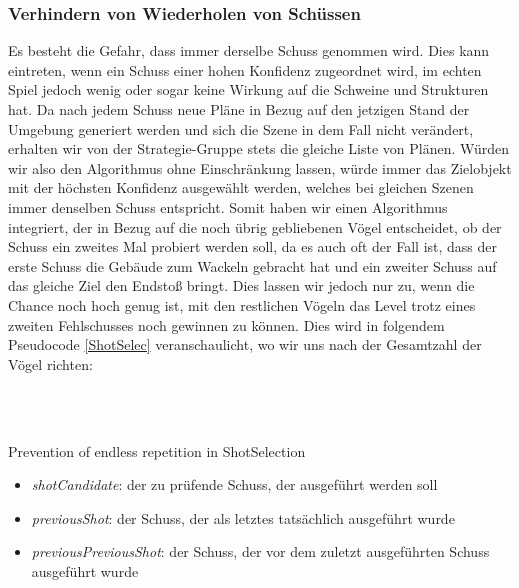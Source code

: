 \subsubsection{Verhindern von Wiederholen von Schüssen}
Es besteht die Gefahr, dass immer derselbe Schuss genommen wird. Dies kann eintreten, wenn ein Schuss einer hohen Konfidenz zugeordnet wird, im echten Spiel jedoch wenig oder sogar keine Wirkung auf die Schweine und Strukturen hat. Da nach jedem Schuss neue Pläne in Bezug auf den jetzigen Stand der Umgebung generiert werden und sich die Szene in dem Fall nicht verändert, erhalten wir von der Strategie-Gruppe stets die gleiche Liste von Plänen. Würden wir also den Algorithmus ohne Einschränkung lassen, würde immer das Zielobjekt mit der höchsten Konfidenz ausgewählt werden, welches bei gleichen Szenen immer denselben Schuss entspricht. 
Somit haben wir einen Algorithmus integriert, der in Bezug auf die noch übrig gebliebenen Vögel entscheidet, ob der Schuss ein zweites Mal probiert werden soll, da es auch oft der Fall ist, dass der erste Schuss die Gebäude zum Wackeln gebracht hat und ein zweiter Schuss auf das gleiche Ziel den Endstoß bringt. Dies lassen wir jedoch nur zu, wenn die Chance noch hoch genug ist, mit den restlichen Vögeln das Level trotz eines zweiten Fehlschusses noch gewinnen zu können. Dies wird in folgendem Pseudocode \ref{ShotSelec} veranschaulicht, wo wir uns nach der Gesamtzahl der Vögel richten: \\
\begin{algorithm}[H]
  \begin{algorithmic}[1]
  	\\ \hspace{2.5em} 
  	\Else \\
  		\hspace{2.5em} 
  	\EndIf
  \EndIf
  \end{algorithmic}
  \caption{Prevention of endless repetition in ShotSelection \label{ShotSelec}}
\end{algorithm}

\begin{table}[H]
\begin{itemize}
\item \textit{shotCandidate}: der zu prüfende Schuss, der ausgeführt werden soll 
\item \textit{previousShot}: der Schuss, der als letztes tatsächlich ausgeführt wurde
\item \textit{previousPreviousShot}: der Schuss, der vor dem zuletzt ausgeführten Schuss ausgeführt wurde
\end{itemize}
\end{table}

